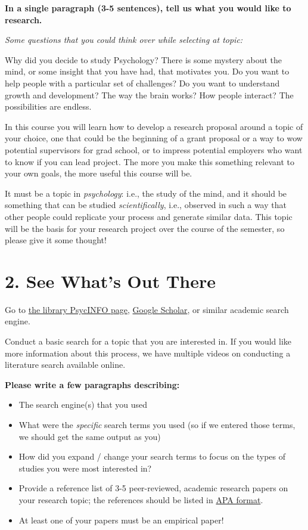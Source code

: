 \documentclass[
]{book}
\begin{document}
\textbf{In a single paragraph (3-5 sentences), tell us what you would like to research.}

\emph{Some questions that you could think over while selecting at topic:}

Why did you decide to study Psychology? There is some mystery about the mind, or some insight that you have had, that motivates you. Do you want to help people with a particular set of challenges? Do you want to understand growth and development? The way the brain works? How people interact? The possibilities are endless.

In this course you will learn how to develop a research proposal around a topic of your choice, one that could be the beginning of a grant proposal or a way to wow potential supervisors for grad school, or to impress potential employers who want to know if you can lead project. The more you make this something relevant to your own goals, the more useful this course will be.

It must be a topic in \emph{psychology}: i.e., the study of the mind, and it should be something that can be studied \emph{scientifically}, i.e., observed in such a way that other people could replicate your process and generate similar data. This topic will be the basis for your research project over the course of the semester, so please give it some thought!

\section*{2. See What's Out There}\label{see-whats-out-there}

Go to \href{https://guides.library.utoronto.ca/psycinfoovid}{the library PsycINFO page}, \href{https://scholar.google.ca/}{Google Scholar}, or similar academic search engine.

Conduct a basic search for a topic that you are interested in. If you would like more information about this process, we have multiple videos on conducting a literature search available online.

\textbf{Please write a few paragraphs describing:}

\begin{itemize}
\item
  The search engine(s) that you used
\item
  What were the \emph{specific} search terms you used (so if we entered those terms, we should get the same output as you)
\item
  How did you expand / change your search terms to focus on the types of studies you were most interested in?
\item
  Provide a reference list of 3-5 peer-reviewed, academic research papers on your research topic; the references should be listed in \href{https://guides.library.utoronto.ca/c.php?g=250462&p=1670709}{APA format}.
\item
  At least one of your papers must be an empirical paper!
\end{itemize}
\end{document}
